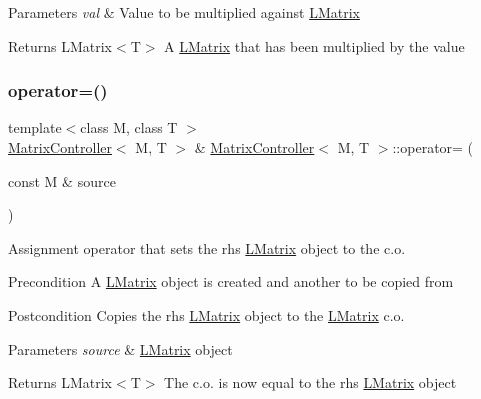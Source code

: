 \begin{DoxyParams}{Parameters}
{\em val} & Value to be multiplied against \mbox{\hyperlink{class_l_matrix}{L\+Matrix}} \\
\hline
\end{DoxyParams}
\begin{DoxyReturn}{Returns}
L\+Matrix$<$\+T$>$ A \mbox{\hyperlink{class_l_matrix}{L\+Matrix}} that has been multiplied by the value 
\end{DoxyReturn}
\mbox{\label{class_matrix_controller_ad7a26021ed274944adbc4df6c068de35}} 
\subsubsection{\texorpdfstring{operator=()}{operator=()}}
{\footnotesize\ttfamily template$<$class M, class T $>$ \\
\mbox{\hyperlink{class_matrix_controller}{Matrix\+Controller}}$<$ M, T $>$ \& \mbox{\hyperlink{class_matrix_controller}{Matrix\+Controller}}$<$ M, T $>$\+::operator= (\begin{DoxyParamCaption}\item[{const M \&}]{source }\end{DoxyParamCaption})}



Assignment operator that sets the rhs \mbox{\hyperlink{class_l_matrix}{L\+Matrix}} object to the c.\+o. 

\begin{DoxyPrecond}{Precondition}
A \mbox{\hyperlink{class_l_matrix}{L\+Matrix}} object is created and another to be copied from 
\end{DoxyPrecond}
\begin{DoxyPostcond}{Postcondition}
Copies the rhs \mbox{\hyperlink{class_l_matrix}{L\+Matrix}} object to the \mbox{\hyperlink{class_l_matrix}{L\+Matrix}} c.\+o. 
\end{DoxyPostcond}

\begin{DoxyParams}{Parameters}
{\em source} & \mbox{\hyperlink{class_l_matrix}{L\+Matrix}} object \\
\hline
\end{DoxyParams}
\begin{DoxyReturn}{Returns}
L\+Matrix$<$\+T$>$ The c.\+o. is now equal to the rhs \mbox{\hyperlink{class_l_matrix}{L\+Matrix}} object 
\end{DoxyReturn}
\mbox{\label{class_matrix_controller_a944709b73c0cf4d0b962eb26840a896a}} 
